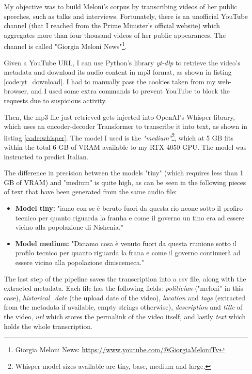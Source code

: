 My objective was to build Meloni's corpus by transcribing videos of her public speeches, such as talks and interviews. Fortunately, there is an unofficial YouTube channel (that I reached from the Prime Minister's official website) which aggregates more than four thousand videos of her public appearances. The channel is called "Giorgia Meloni News"\footnote{Giorgia Meloni News: \url{https://www.youtube.com/@GiorgiaMeloniTv}}.

Given a YouTube URL, I can use Python's library \textit{yt-dlp} to retrieve the video's metadata and download its audio content in mp3 format, as shown in listing \ref{code:yt_download}. I had to manually pass the cookies taken from my web-browser, and I used some extra commands to prevent YouTube to block the requests due to suspicious activity. 

Then, the mp3 file just retrieved gets injected into OpenAI's Whisper library, which uses an encoder-decoder Transformer to transcribe it into text, as shown in listing \ref{code:whisper}. The model I used is the \textit{"medium"}\footnote{Whisper model sizes available are tiny, base, medium and large.}, which at 5 GB fits within the total 6 GB of VRAM available to my RTX 4050 GPU. The model was instructed to predict Italian. 

The difference in precision between the models "tiny" (which requires less than 1 GB of VRAM) and "medium" is quite high, as can be seen in the following pieces of text that have been generated from the same audio file:

\begin{itemize}
    \item \textbf{Model tiny:} "iamo con se è beruto fuori da questa rio neone sotto il profiro tecnico per quanto riguarda la franha e come il governo un tino era ad essere vicino alla popolazione di Nishenia."
    \item \textbf{Model medium:} "Diciamo cosa è venuto fuori da questa riunione sotto il profilo tecnico per quanto riguarda la frana e come il governo continuerà ad essere vicino alla popolazione diniscemeca."
\end{itemize}

The last step of the pipeline saves the transcription into a csv file, along with the extracted metadata. Each file has the following fields: \textit{politician} ("meloni" in this case), \textit{historical\_date} (the upload date of the video), \textit{location} and \textit{tags} (extracted from the metadata if available, empty strings otherwise), \textit{description} and \textit{title} of the video, \textit{url} which stores the permalink of the video itself, and lastly \textit{text} which holds the whole transcription.

